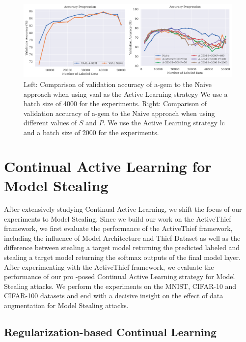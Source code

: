 \begin{figure}[h]
    \centering
    \includegraphics[width=\linewidth]{images/results_CAL/AGEM_plots.png}
    \caption[Continual Active Learning Custom Replay strategy]{Left: Comparison of validation accuracy of \gls{a-gem} to the Naive approach when using \gls{vaal} as the Active Learning strategy We use a batch size of 4000 for the experiments. Right: Comparison of validation accuracy of \gls{a-gem}
     to the Naive approach when using different values of $S$ and $P$. We use the Active Learning strategy \gls{lc} and a batch size of 2000 for the experiments.}
    \label{fig:Evaluation:Results:CAL:AGEM}
\end{figure}

\section{Continual Active Learning for Model Stealing}
\label{sec:Evaluation:Results:MS}
After extensively studying Continual Active Learning, we shift the focus of our experiments to Model Stealing. Since we build our work on the ActiveThief framework, we first evaluate the performance of the ActiveThief framework, including the influence of Model Architecture and
Thief Dataset as well as the difference between stealing a target model returning the predicted labeled and stealing a target model returning the softmax outputs of the final model layer. After experimenting with the ActiveThief framework, we evaluate the performance of our pro
-posed Continual Active Learning strategy for Model Stealing attacks. We perform the experiments on the MNIST, CIFAR-10 and CIFAR-100 datasets and end with a decisive insight on the effect of data augmentation for Model Stealing attacks. \par


\subsection{Regularization-based Continual Learning}
\label{sec:Evaluation:Results:MS:Regularization}


